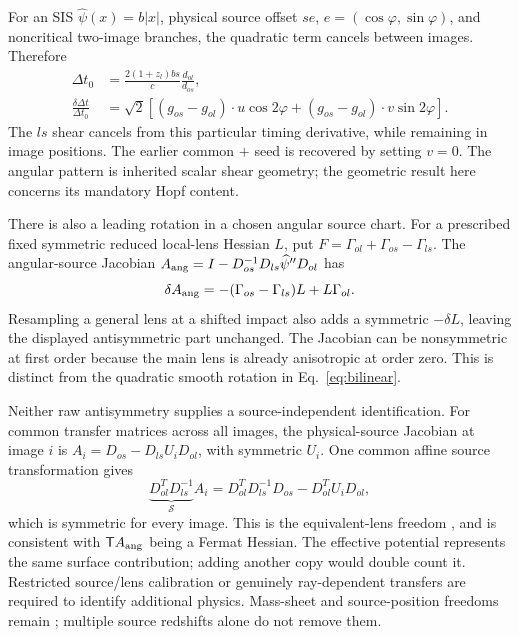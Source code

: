 \documentclass[11pt,a4paper]{article}
\begin{document}
For an SIS $\widehat\psi(x)=b|x|$, physical source offset $s e$,
$e=(\cos\varphi,\sin\varphi)$, and noncritical two-image branches,
the quadratic term cancels between images. Therefore
\begin{align}
 \Delta t_0&=\frac{2(1+z_l)bs}{c}\frac{d_{ol}}{d_{os}},\nonumber\\
 \frac{\delta\Delta t}{\Delta t_0}
 &=\sqrt2[(g_{os}-g_{ol})\cdot u\cos2\varphi
 +(g_{os}-g_{ol})\cdot v\sin2\varphi].
 \label{eq:sis}
\end{align}
The $ls$ shear cancels from this particular timing derivative, while
remaining in image positions. The earlier common $+$ seed is recovered
by setting $v=0$. The angular pattern is inherited scalar shear geometry;
the geometric result here concerns its mandatory Hopf content.

There is also a leading rotation in a chosen angular source chart.
For a prescribed fixed symmetric reduced local-lens Hessian $L$, put
$F=\Gamma_{ol}+\Gamma_{os}-\Gamma_{ls}$. The angular-source Jacobian
$A_{\rm ang}=I-D_{os}^{-1}D_{ls}\widehat\psi''D_{ol}$ has
\begin{equation}
 \delta A_{\rm ang}=-(\Gamma_{os}-\Gamma_{ls})L+L\Gamma_{ol}.
 \label{eq:lensrotation}
\end{equation}
Resampling a general lens at a shifted impact also adds a symmetric
$-\delta L$, leaving the displayed antisymmetric part unchanged.
The Jacobian can be nonsymmetric at first order because the main lens is already
anisotropic at order zero. This is distinct from the quadratic smooth
rotation in Eq.~\eqref{eq:bilinear}.

Neither raw antisymmetry supplies a source-independent identification.
For common transfer matrices across all images, the physical-source
Jacobian at image $i$ is $A_i=D_{os}-D_{ls}U_iD_{ol}$, with symmetric
$U_i$. One common affine source transformation gives
\begin{equation}
 \underbrace{D_{ol}^TD_{ls}^{-1}}_{\mathcal S}A_i
 =D_{ol}^TD_{ls}^{-1}D_{os}-D_{ol}^TU_iD_{ol},
 \label{eq:symmetrizer}
\end{equation}
which is symmetric for every image. This is the equivalent-lens freedom
\cite{Schneider1997Equivalent,Fleury2021Arbitrary}, and is consistent
with $\mathsf T A_{\rm ang}$ being a Fermat Hessian. The effective
potential represents the same surface contribution; adding another copy
would double count it. Restricted source/lens calibration or genuinely
ray-dependent transfers are required to identify additional physics.
Mass-sheet and source-position freedoms remain
\cite{Schneider2019Multiplane,SchneiderSluse2014SPT}; multiple source
redshifts alone do not remove them.
\end{document}
